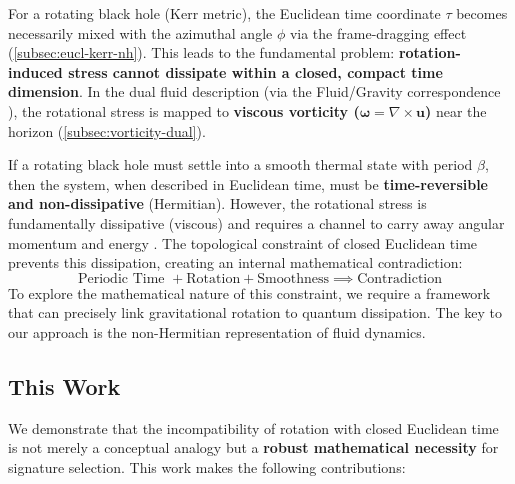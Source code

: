 \documentclass[11pt]{article}
\begin{document}
For a rotating black hole (Kerr metric\cite{Kerr1963}), the Euclidean time coordinate $\tau$ becomes necessarily mixed with the azimuthal angle $\phi$ via the frame-dragging effect (\autoref{subsec:eucl-kerr-nh}). This leads to the fundamental problem: \textbf{rotation-induced stress cannot dissipate within a closed, compact time dimension}. In the dual fluid description (via the Fluid/Gravity correspondence \cite{FluidGravity2008}), the rotational stress is mapped to \textbf{viscous vorticity ($\mathbf{\omega} = \nabla \times \mathbf{u}$)} near the horizon (\autoref{subsec:vorticity-dual}).

If a rotating black hole must settle into a smooth thermal state with period $\beta$, then the system, when described in Euclidean time, must be \textbf{time-reversible and non-dissipative} (Hermitian). However, the rotational stress is fundamentally dissipative (viscous) and requires a channel to carry away angular momentum and energy \cite{Hawking1975}. The topological constraint of closed Euclidean time prevents this dissipation, creating an internal mathematical contradiction:
\[
    \text{Periodic Time } + \text{Rotation} + \text{Smoothness} \implies \text{Contradiction}
\]
To explore the mathematical nature of this constraint, we require a framework that can precisely link gravitational rotation to quantum dissipation. The key to our approach is the non-Hermitian representation of fluid dynamics.

\subsection{This Work}

We demonstrate that the incompatibility of rotation with closed Euclidean time is not merely a conceptual analogy but a \textbf{robust mathematical necessity} for signature selection. This work makes the following contributions:
\end{document}
